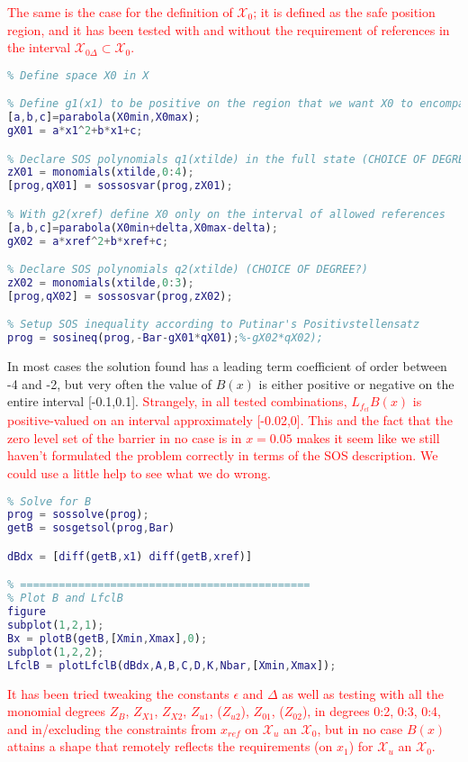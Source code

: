 \textcolor{red}{The same is the case for the definition of $\mathcal{X}_0$; it is defined as the safe position region, and it has been tested with and without the requirement of references in the interval $\mathcal{X}_{0\Delta} \subset \mathcal{X}_0$.}
\begin{lstlisting}[language=matlab]
% =============================================
% Define space X0 in X

% Define g1(x1) to be positive on the region that we want X0 to encompass
[a,b,c]=parabola(X0min,X0max);
gX01 = a*x1^2+b*x1+c;

% Declare SOS polynomials q1(xtilde) in the full state (CHOICE OF DEGREEE?)
zX01 = monomials(xtilde,0:4);
[prog,qX01] = sossosvar(prog,zX01);

% With g2(xref) define X0 only on the interval of allowed references
[a,b,c]=parabola(X0min+delta,X0max-delta);
gX02 = a*xref^2+b*xref+c;

% Declare SOS polynomials q2(xtilde) (CHOICE OF DEGREE?)
zX02 = monomials(xtilde,0:3);
[prog,qX02] = sossosvar(prog,zX02);

% Setup SOS inequality according to Putinar's Positivstellensatz
prog = sosineq(prog,-Bar-gX01*qX01);%-gX02*qX02);
\end{lstlisting}
In most cases the solution found has a leading term coefficient of order between -4 and -2, but very often the value of $B(x)$ is either positive or negative on the entire interval [-0.1,0.1]. \textcolor{red}{Strangely, in all tested combinations, $L_{f_{cl}}B(x)$ is positive-valued on an interval approximately [-0.02,0]. This and the fact that the zero level set of the barrier in no case is in $x=0.05$ makes it seem like we still haven't formulated the problem correctly in terms of the SOS description. We could use a little help to see what we do wrong.} 
\begin{lstlisting}[language=matlab]
% =============================================
% Solve for B
prog = sossolve(prog);
getB = sosgetsol(prog,Bar)

dBdx = [diff(getB,x1) diff(getB,xref)]

% =============================================
% Plot B and LfclB
figure
subplot(1,2,1);
Bx = plotB(getB,[Xmin,Xmax],0);
subplot(1,2,2);
LfclB = plotLfclB(dBdx,A,B,C,D,K,Nbar,[Xmin,Xmax]);
\end{lstlisting}

\textcolor{red}{It has been tried tweaking the constants $\epsilon$ and $\Delta$ as well as testing with all the monomial degrees $Z_B$, $Z_{X1}$, $Z_{X2}$, $Z_{u1}$, ($Z_{u2}$), $Z_{01}$, ($Z_{02}$), in degrees 0:2, 0:3, 0:4, and in/excluding the constraints from $x_{ref}$ on $\mathcal{X}_u$ an $\mathcal{X}_0$, but in no case $B(x)$ attains a shape that remotely reflects the requirements (on $x_1$) for $\mathcal{X}_u$ an $\mathcal{X}_0$.}
